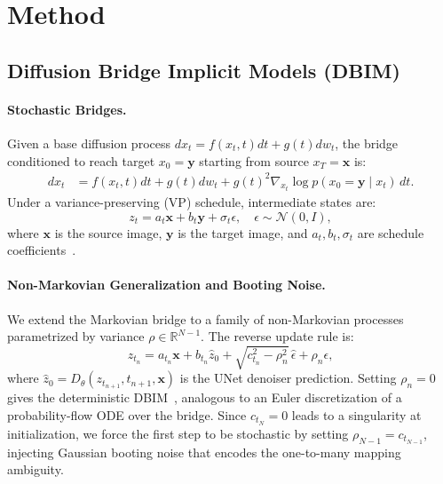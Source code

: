 \section{Method}
\label{sec:method}

\subsection{Diffusion Bridge Implicit Models (DBIM)}
\label{sec:dbim}

\paragraph{Stochastic Bridges.}
Given a base diffusion process $dx_t = f(x_t,t)dt + g(t)dw_t$, the bridge conditioned to reach target $x_0 = \bm{y}$ starting from source $x_T = \bm{x}$ is:
\begin{align}
    dx_t &= f(x_t,t)dt + g(t)dw_t + g(t)^2 \nabla_{x_t} \log p(x_0{=}\bm{y} \mid x_t)\,dt.
\end{align}
Under a variance-preserving (VP) schedule, intermediate states are:
\begin{equation}
    z_t = a_t \bm{x} + b_t \bm{y} + \sigma_t \epsilon, \quad \epsilon \sim \mathcal{N}(0, I),
\end{equation}
where $\bm{x}$ is the source image, $\bm{y}$ is the target image, and $a_t, b_t, \sigma_t$ are schedule coefficients~\cite{zhouDenoisingDiffusionBridge2024}.

\paragraph{Non-Markovian Generalization and Booting Noise.}
We extend the Markovian bridge to a family of non-Markovian processes parametrized by variance $\rho \in \mathbb{R}^{N-1}$. The reverse update rule is:
\begin{equation}
    z_{t_n} = a_{t_n} \bm{x} + b_{t_n} \hat{z}_0 + \sqrt{c_{t_n}^2 - \rho_n^2}\,\hat{\epsilon} + \rho_n \epsilon,
\end{equation}
where $\hat{z}_0 = D_\theta(z_{t_{n+1}}, t_{n+1}, \bm{x})$ is the UNet denoiser prediction. Setting $\rho_n = 0$ gives the deterministic DBIM~\cite{zhengDiffusionBridgeImplicit2025}, analogous to an Euler discretization of a probability-flow ODE over the bridge. Since $c_{t_N} = 0$ leads to a singularity at initialization, we force the first step to be stochastic by setting $\rho_{N-1} = c_{t_{N-1}}$, injecting Gaussian booting noise that encodes the one-to-many mapping ambiguity.

